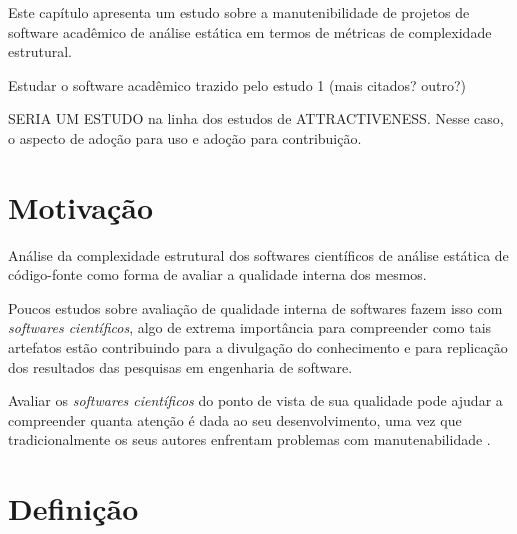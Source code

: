 {Este capítulo apresenta um estudo sobre a manutenibilidade de projetos de
software acadêmico de análise estática em termos de métricas de complexidade
estrutural.}
\label{estudo3}


Estudar o software acadêmico trazido pelo estudo 1 (mais citados? outro?)

SERIA UM ESTUDO na linha dos estudos de  ATTRACTIVENESS.
Nesse caso, o aspecto de adoção para uso e adoção para contribuição.

\section{Motivação}

Análise da complexidade estrutural dos softwares científicos de análise
estática de código-fonte como forma de avaliar a qualidade interna dos mesmos.

Poucos estudos sobre avaliação de qualidade interna de softwares fazem isso com
{\it softwares científicos}, algo de extrema importância para compreender como
tais artefatos estão contribuindo para a divulgação do conhecimento e para
replicação dos resultados das pesquisas em engenharia de software.

Avaliar os {\it softwares científicos} do ponto de vista de sua qualidade pode
ajudar a compreender quanta atenção é dada ao seu desenvolvimento, uma vez que
tradicionalmente os seus autores enfrentam problemas com manutenabilidade
\cite{prlic2012ten}.

%
%
%
%
%

\section{Definição} \label{sec:study2:definition}


